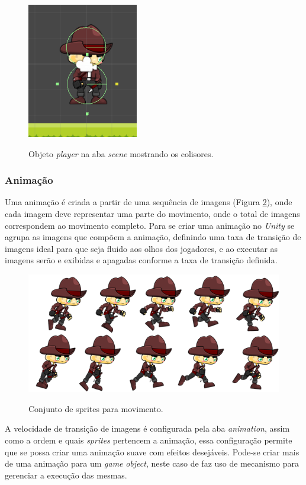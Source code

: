 \documentclass[
	12pt,				%
    oneside,			%
	a4paper,			%
	english,			%
	french,				%
	spanish,			%
	brazil,				%
	]{abntex2}
\begin{document}
				\begin{figure}[H]
					\caption{Objeto \textit{player} na aba \textit{scene} mostrando os colisores.}
					\centering
					\includegraphics[width=0.4\linewidth]{Imagens/13}
					\label{fig:13}
				\end{figure}
				
			\subsubsection{Animação}
			Uma animação é criada a partir de uma sequência de imagens (Figura \ref{fig:14}), onde cada imagem deve representar uma parte do movimento, onde o total de imagens correspondem ao movimento completo. Para se criar uma animação no \textit{Unity} se agrupa as imagens que compõem a animação, definindo uma taxa de transição de imagens ideal para que seja fluido aos olhos dos jogadores, e ao executar as imagens serão e exibidas e apagadas conforme a taxa de transição definida.			
				
				\begin{figure}[H]
					\caption{Conjunto de sprites para movimento.}
					\centering
					\includegraphics[width=0.6\linewidth]{Imagens/14}
					\label{fig:14}
				\end{figure}
			
				A velocidade de transição de imagens é configurada pela aba \textit{animation}, assim como a ordem e quais \textit{sprites} pertencem a animação, essa configuração permite que se possa criar uma animação suave com efeitos desejáveis. Pode-se criar mais de uma animação para um \textit{game} \textit{object}, neste caso de faz uso de mecanismo para gerenciar a execução das mesmas.
				
\end{document}
